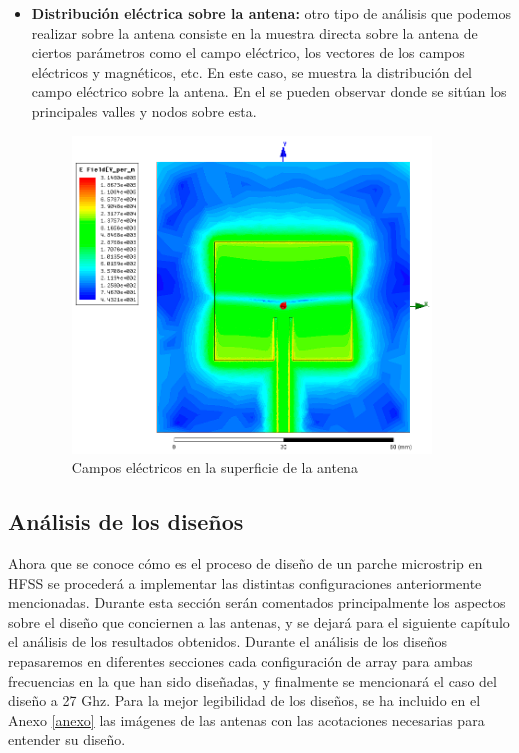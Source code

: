 \begin{itemize}
\item \textbf{Distribución eléctrica sobre la antena: }otro tipo de análisis que podemos realizar sobre la antena consiste en la muestra directa sobre la antena de ciertos parámetros como el campo eléctrico, los vectores de los campos eléctricos y magnéticos, etc. En este caso, se muestra la distribución del campo eléctrico sobre la antena. En el se pueden observar donde se sitúan los principales valles y nodos sobre esta.
\vfill
	\begin{figure}[H]
    \centering
        \includegraphics[width=0.9\textwidth]{archivos/analisis/1x11/7}
        \caption{Campos eléctricos en la superficie de la antena}
        \label{fig:Complexmage}
	\end{figure}

\end{itemize}

\subsection{Análisis de los diseños}
\label{analdis}
\par Ahora que se conoce cómo es el proceso de diseño de un parche microstrip en HFSS se procederá a implementar las distintas configuraciones anteriormente mencionadas. Durante esta sección serán comentados principalmente los aspectos sobre el diseño que conciernen a las antenas, y se dejará para el siguiente capítulo el análisis de los resultados obtenidos. Durante el análisis de los diseños repasaremos en diferentes secciones cada configuración de array para ambas frecuencias en la que han sido diseñadas, y finalmente se mencionará el caso del diseño a 27 Ghz. Para la mejor legibilidad de los diseños, se ha incluido en el Anexo \ref{anexo} las imágenes de las antenas con las acotaciones necesarias para entender su diseño.

